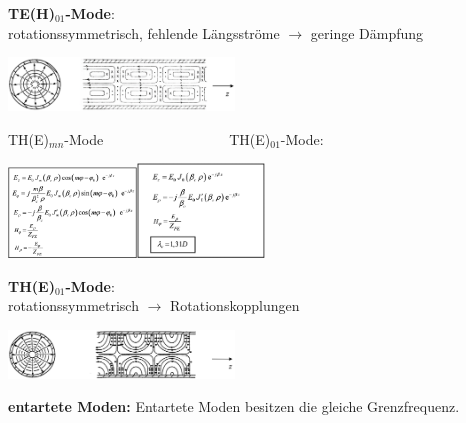 \documentclass[english]{latex4ei/latex4ei_sheet}
\begin{document}
\begin{sectionbox}
    \textbf{TE(H)$_{01}$-Mode}:\\
    rotationssymmetrisch, fehlende Längsströme $\rightarrow$ geringe Dämpfung
    \begin{center}\includegraphics[width = 6cm]{./img/hl-rund-h01_2.png}\end{center}
    TH(E)$_{mn}$-Mode$\quad\quad\quad\quad\quad\quad\quad\quad\quad$TH(E)$_{01}$-Mode:
    \begin{center}\includegraphics[width = 3.4cm]{./img/hl-rund-emn.png}\includegraphics[width = 3.4cm]{./img/hl-rund-e01.png}\end{center}
    \textbf{TH(E)$_{01}$-Mode}:\\
    rotationssymmetrisch $\rightarrow$ Rotationskopplungen
    \begin{center}\includegraphics[width = 6cm]{./img/hl-rund-e01_2.png}\end{center}

\end{sectionbox}
\begin{sectionbox}
    \textbf{entartete Moden:}
    Entartete Moden besitzen die gleiche Grenzfrequenz.
\end{sectionbox}
\end{document}
